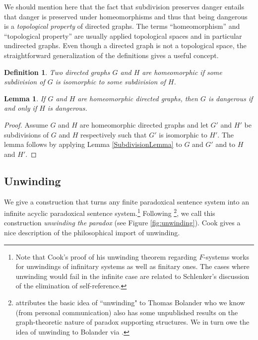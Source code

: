 \documentclass[12pt]{kluwer}
\newtheorem{lem}[thm]{Lemma}
\newtheorem{defn}{Definition}
\theoremstyle{remark}
\begin{document}
We should mention here that the fact that subdivision preserves danger entails that danger is preserved under homeomorphisms and thus that being dangerous is a \textit{topological property} of directed graphs.  The terms ``homeomorphism'' and ``topological property'' are usually applied topological spaces and in particular undirected graphs.  Even though a directed graph is not a topological space, the straightforward generalization of the definitions gives a useful concept.

\begin{defn}
Two directed graphs $G$ and $H$ are \emph{homeomorphic} if some subdivision of $G$ is isomorphic to some subdivision of $H$.
\end{defn}

\begin{lem}
If $G$ and $H$ are homeomorphic directed graphs, then $G$ is dangerous if and only if $H$ is dangerous.
\end{lem}
\begin{proof}
Assume $G$ and $H$ are homeomorphic directed graphs and let $G'$ and $H'$ be subdivisions of $G$ and $H$ respectively such that $G'$ is isomorphic to $H'$. The lemma follows by applying Lemma \ref{SubdivisionLemma} to $G$ and $G'$ and to $H$ and $H'$.
\end{proof}

\subsection{Unwinding}
We give a construction that turns any finite paradoxical sentence system into an infinite acyclic paradoxical sentence system.\footnote{Note that Cook's \cite{cook} proof of his unwinding theorem regarding $F$-systems works for unwindings of infinitary systems as well as finitary ones. The cases where unwinding would fail in the infinite case are related to Schlenker's \cite{schlenker2007elimination} discussion of the elimination of self-reference.}  Following \cite{cook}\footnote{\cite{cook} attributes the basic idea of ``unwinding" to Thomas Bolander who we know (from personal communication) also has some unpublished results on the graph-theoretic nature of paradox supporting structures. We in turn owe the idea of unwinding to Bolander via \cite{cook}.}, we call this construction \textit{unwinding the paradox} (see Figure \ref{fig:unwinding}). Cook gives a nice description of the philosophical import of unwinding.
\end{document}
